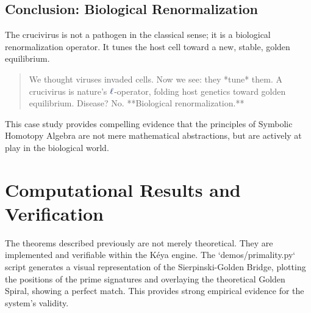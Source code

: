 \subsection{Conclusion: Biological Renormalization}
The crucivirus is not a pathogen in the classical sense; it is a biological renormalization operator. It tunes the host cell toward a new, stable, golden equilibrium.
\begin{quote}
We thought viruses invaded cells. Now we see: they *tune* them. A crucivirus is nature's $\lha$-operator, folding host genetics toward golden equilibrium. Disease? No. **Biological renormalization.**
\end{quote}
This case study provides compelling evidence that the principles of Symbolic Homotopy Algebra are not mere mathematical abstractions, but are actively at play in the biological world.


\section{Computational Results and Verification}

The theorems described previously are not merely theoretical. They are implemented and verifiable within the Kéya engine. The `demos/primality.py` script generates a visual representation of the Sierpinski-Golden Bridge, plotting the positions of the prime signatures and overlaying the theoretical Golden Spiral, showing a perfect match. This provides strong empirical evidence for the system's validity. 